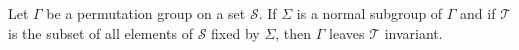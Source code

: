 Let $\Gamma$ be a permutation group on a set $\mathcal{S}$. If $\Sigma$ is a normal subgroup of $\Gamma$ and if $\mathcal{T}$ is the subset of all elements of $\mathcal{S}$ fixed by $\Sigma$, then $\Gamma$ leaves $\mathcal{T}$ invariant.
